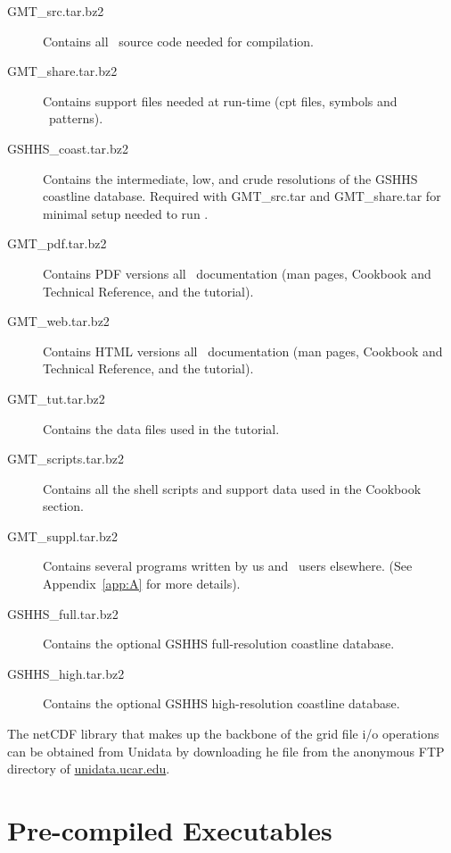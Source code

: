 \begin{description}

\item[GMT\_src.tar.bz2] Contains all \GMT\ source code needed for compilation.

\item[GMT\_share.tar.bz2] Contains support files needed at run-time (cpt files, symbols and \PS\ patterns).

\item[GSHHS\_coast.tar.bz2] Contains the intermediate,
low, and crude resolutions of the GSHHS coastline database.  Required
with GMT\_src.tar and GMT\_share.tar for minimal setup needed to run \GMT.

\item[GMT\_pdf.tar.bz2] Contains PDF versions all \GMT\ documentation
(man pages, Cookbook and Technical Reference, and the tutorial).

\item[GMT\_web.tar.bz2] Contains HTML versions all \GMT\ documentation
(man pages, Cookbook and Technical Reference, and the tutorial).

\item[GMT\_tut.tar.bz2] Contains the data files used in the tutorial.

\item[GMT\_scripts.tar.bz2] Contains all the shell scripts
and support data used in the Cookbook section.

\item[GMT\_suppl.tar.bz2] Contains several programs
written by us and \GMT\ users elsewhere. (See Appendix~\ref{app:A} for more
details).

\item[GSHHS\_full.tar.bz2] Contains the optional GSHHS
full-resolution coastline database.

\item[GSHHS\_high.tar.bz2] Contains the optional GSHHS
high-resolution coastline database.

\end{description}


The netCDF library that makes up the backbone of the grid file
i/o operations can be obtained from  Unidata by downloading he file
 from the anonymous FTP directory of
\underline{unidata.ucar.edu}.

\section{Pre-compiled Executables}

